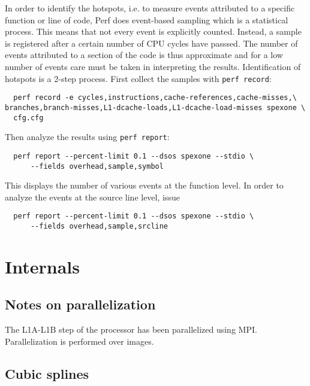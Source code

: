 \documentclass{article}
\begin{document}
In order to identify the hotspots, i.e. to measure events attributed to a specific function or line of code, Perf does event-based sampling which is a statistical process. This means that not every event is explicitly counted. Instead, a sample is registered after a certain number of CPU cycles have passsed. The number of events attributed to a section of the code is thus approximate and for a low number of events care must be taken in interpreting the results. Identification of hotspots is a 2-step process. First collect the samples with \lstinline!perf record!:
\begin{lstlisting}
  perf record -e cycles,instructions,cache-references,cache-misses,\
branches,branch-misses,L1-dcache-loads,L1-dcache-load-misses spexone \
  cfg.cfg
\end{lstlisting}
Then analyze the results using \lstinline!perf report!:
\begin{lstlisting}
  perf report --percent-limit 0.1 --dsos spexone --stdio \
      --fields overhead,sample,symbol
\end{lstlisting}
This displays the number of various events at the function level. In order to analyze the events at the source line level, issue
\begin{lstlisting}
  perf report --percent-limit 0.1 --dsos spexone --stdio \
      --fields overhead,sample,srcline
\end{lstlisting}

\section{Internals}

\subsection{Notes on parallelization}

The L1A-L1B step of the processor has been parallelized using MPI. Parallelization is performed over images.

\subsection{Cubic splines}
\end{document}
